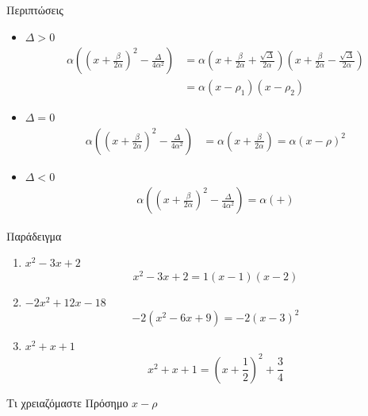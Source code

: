 \documentclass{presentation}
\begin{document}
\begin{frame}{Περιπτώσεις}
  \begin{itemize}[<+->]
    \item $Δ>0$
          \begin{align*}
            α\left(\left( x+\frac{β}{2α} \right)^2 - \frac{Δ}{4α^2}\right) & =
            α\left( x+\frac{β}{2α} + \frac{\sqrt{Δ}}{2α} \right)\left( x+\frac{β}{2α} - \frac{\sqrt{Δ}}{2α} \right) \\
                                                                           & = α(x-ρ_1)(x-ρ_2)
          \end{align*}
    \item $Δ=0$
          \begin{align*}
            α\left(\left( x+\frac{β}{2α} \right)^2 - \frac{Δ}{4α^2}\right) & =
            α\left( x+\frac{β}{2α} \right) = α(x-ρ)^2
          \end{align*}
    \item $Δ<0$
          \begin{align*}
            α\left(\left( x+\frac{β}{2α} \right)^2 - \frac{Δ}{4α^2}\right) =
            α\left(+\right)
          \end{align*}
  \end{itemize}
\end{frame}

\begin{frame}{Παράδειγμα}

  \begin{enumerate}[<+->]
    \item $x^2-3x+2$
          $$x^2-3x+2=1(x-1)(x-2)$$
    \item $-2x^2+12x-18$
          $$-2(x^2-6x+9)=-2(x-3)^2$$
    \item $x^2+x+1$
          $$x^2+x+1=\left(x+\frac{1}{2}\right)^2+\frac{3}{4}$$
  \end{enumerate}

\end{frame}

\begin{frame}{Τι χρειαζόμαστε}
  Πρόσημο $x-ρ$
  \begin{center}
  \end{center}

\end{frame}
\end{document}
